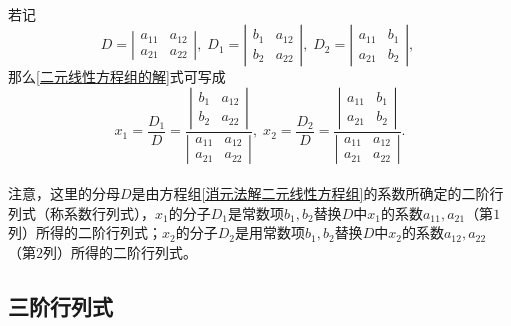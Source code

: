 \paragraph{}
若记
\begin{equation*}
  D = \left|\begin{array}{ll} a_{11} & a_{12} \\ a_{21} & a_{22} \end{array}\right|, \;
  D_1 = \left|\begin{array}{ll} b_1 & a_{12} \\ b_2 & a_{22} \end{array}\right|, \;
  D_2 = \left|\begin{array}{ll} a_{11} & b_1 \\ a_{21} & b_2 \end{array}\right|, \;
\end{equation*}
那么\eqref{二元线性方程组的解}式可写成
\begin{equation*}
  x_1 = \frac{D_1}{D} = \frac{\left|\begin{array}{ll} b_1 & a_{12} \\ b_2 & a_{22} \end{array}\right|}{\left|\begin{array}{ll} a_{11} & a_{12} \\ a_{21} & a_{22} \end{array}\right|}, \;
  x_2 = \frac{D_2}{D} = \frac{\left|\begin{array}{ll} a_{11} & b_1 \\ a_{21} & b_2 \end{array}\right|}{\left|\begin{array}{ll} a_{11} & a_{12} \\ a_{21} & a_{22} \end{array}\right|}.
\end{equation*}

\paragraph{}
注意，这里的分母$D$是由方程组\eqref{消元法解二元线性方程组}的系数所确定的二阶行列式（称系数行列式），$x_1$的分子$D_1$是常数项$b_1,b_2$替换$D$中$x_1$的系数$a_{11}, a_{21}$（第$1$列）所得的二阶行列式；$x_2$的分子$D_2$是用常数项$b_1, b_2$替换$D$中$x_2$的系数$a_{12}, a_{22}$（第$2$列）所得的二阶行列式。

\subsection{三阶行列式}
